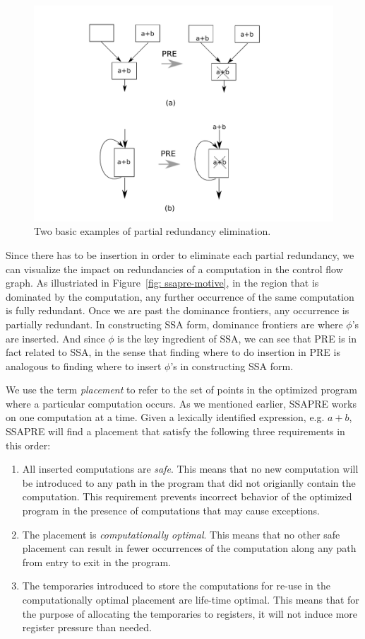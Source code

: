 \begin{figure}
\centering
\includegraphics[scale=0.45]{fig-pre-examples.pdf}
\caption{Two basic examples of partial redundancy elimination.}
\label{fig: pre-examples}
\end{figure}

Since there has to be insertion in order to eliminate each partial
redundancy, we can visualize the impact on redundancies of a computation
in the control flow graph.  As illustriated in
Figure~\ref{fig: ssapre-motive}, in the region that is dominated by the 
computation, any further occurrence of the same computation is fully 
redundant.  Once we are past the dominance frontiers, any occurrence is
partially redundant.  In constructing SSA form, dominance frontiers are where
$\phi$'s are inserted.  And since $\phi$ is the key ingredient of SSA, we
can see that PRE is in fact related to SSA, in the sense that finding where
to do insertion in PRE is analogous to finding where to insert $\phi$'s in
constructing SSA form.

We use the term \emph{placement} to refer to the set of points in the 
optimized program where a particular computation occurs.
As we mentioned earlier, SSAPRE works on one computation at a time.
Given a lexically identified expression, e.g. $a+b$, SSAPRE will find
a placement that satisfy the following three requirements in this order:
\begin{enumerate}
\item All inserted computations are \emph{safe}.  This means that no new 
computation will be introduced to any path in the program that did not 
origianlly contain the computation.  This requirement prevents incorrect 
behavior of the optimized program in the presence of computations that may 
cause exceptions.
\item The placement is \emph{computationally optimal}.  This means that no
other safe placement can result in fewer occurrences of the computation
along any path from entry to exit in the program.
\item The temporaries introduced to store the computations for re-use in the
computationally optimal placement are life-time optimal.  This means that
for the purpose of allocating the temporaries to registers, it will not
induce more register pressure than needed.
\end{enumerate}

